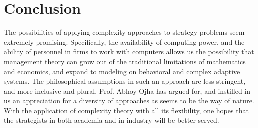 \documentclass[12pt]{article}
\begin{document}
\section{Conclusion}\label{S:Conclusion}
The possibilities of applying complexity approaches to strategy problems seem extremely promising. Specifically, the availability of computing power, and the ability of personnel in firms to work with computers allows us the possibility that management theory can grow out of the traditional limitations of mathematics and economics, and expand to modeling on behavioral and complex adaptive systems. The philosophical assumptions in such an approach are less stringent, and more inclusive and plural. Prof. Abhoy Ojha has argued for, and instilled in us an appreciation for a diversity of approaches as seems to be the way of nature. With the application of complexity theory with all its flexibility, one hopes that the strategists in both academia and in industry will be better served.

 

\end{document}
